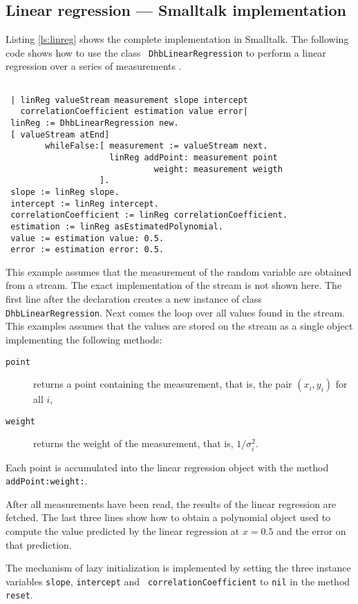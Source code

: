\documentclass[twoside]{book}
\begin{document}
\subsection{Linear regression --- Smalltalk  implementation}
Listing \ref{ls:linreg} shows the complete implementation in
Smalltalk. The following code shows how to use the class {\tt
DhbLinearRegression} to perform a linear regression over a series
of measurements .
\begin{codeExample}
\begin{verbatim}

 | linReg valueStream measurement slope intercept
   correlationCoefficient estimation value error|
 linReg := DhbLinearRegression new.
 [ valueStream atEnd]
        whileFalse:[ measurement := valueStream next.
                     linReg addPoint: measurement point
                              weight: measurement weigth
                   ].
 slope := linReg slope.
 intercept := linReg intercept.
 correlationCoefficient := linReg correlationCoefficient.
 estimation := linReg asEstimatedPolynomial.
 value := estimation value: 0.5.
 error := estimation error: 0.5.
\end{verbatim}
\end{codeExample}
This example assumes that the measurement of the random variable
are obtained from a stream. The exact implementation of the stream
is not shown here. The first line after the declaration creates a
new instance of class {\tt DhbLinearRegression}. Next comes the
loop over all values found in the stream. This examples assumes
that the values are stored on the stream as a single object
implementing the following methods:
\begin{description}
  \item[\tt point] returns a point containing the measurement,
  that is, the pair $\left(x_i,y_i\right)$ for all $i$,
  \item[\tt weight] returns the weight of the measurement, that
  is, $1/\sigma^2_i$.
\end{description}
\noindent Each point is accumulated into the linear regression
object with the method {\tt addPoint:weight:}.

After all measurements have been read, the results of the linear
regression are fetched. The last three lines show how to obtain a
polynomial object used to compute the value predicted by the
linear regression at $x=0.5$ and the error on that prediction.

The mechanism of lazy initialization is implemented by setting the
three instance variables {\tt slope}, {\tt intercept} and {\tt
correlationCoefficient} to {\tt nil} in the method {\tt reset}.
\end{document}

